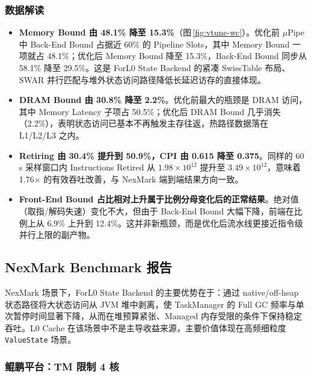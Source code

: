 \documentclass[a4paper,11pt]{article}
\newcommand{\project}{ForL0 State Backend}
\begin{document}
\subsubsection{数据解读}

\begin{itemize}
  \item \textbf{Memory Bound 由 48.1\% 降至 15.3\%}（图\,\ref{fig:vtune-wc}）。优化前 $\mu$Pipe 中 Back-End Bound 占据近 60\% 的 Pipeline Slots，其中 Memory Bound 一项就占 48.1\%；优化后 Memory Bound 降至 15.3\%，Back-End Bound 同步从 58.1\% 降至 29.5\%。这是 \project{} 的紧凑 SwissTable 布局、SWAR 并行匹配与堆外状态访问路径降低长延迟访存的直接体现。
  \item \textbf{DRAM Bound 由 30.8\% 降至 2.2\%}。优化前最大的瓶颈是 DRAM 访问，其中 Memory Latency 子项占 50.5\%；优化后 DRAM Bound 几乎消失（2.2\%），表明状态访问已基本不再触发主存往返，热路径数据落在 L1/L2/L3 之内。
  \item \textbf{Retiring 由 30.4\% 提升到 50.9\%，CPI 由 0.615 降至 0.375}。同样的 60\,s 采样窗口内 Instructions Retired 从 $1.98\times 10^{12}$ 提升至 $3.49\times 10^{12}$，意味着 1.76$\times$ 的有效吞吐改善，与 NexMark 端到端结果方向一致。
  \item \textbf{Front-End Bound 占比相对上升属于比例分母变化后的正常结果}。绝对值（取指/解码失速）变化不大，但由于 Back-End Bound 大幅下降，前端在比例上从 6.9\% 上升到 12.4\%。这并非新瓶颈，而是优化后流水线更接近指令级并行上限的副产物。
\end{itemize}

\subsection{NexMark Benchmark 报告}

NexMark 场景下，\project{} 的主要优势在于：通过 native/off-heap 状态路径将大状态访问从 JVM 堆中剥离，使 TaskManager 的 Full GC 频率与单次暂停时间显著下降，从而在堆预算紧张、Managed 内存受限的条件下保持稳定吞吐。L0 Cache 在该场景中不是主导收益来源，主要价值体现在高频细粒度 \texttt{ValueState} 场景。

\subsubsection{鲲鹏平台：TM 限制 4 核}
\end{document}

